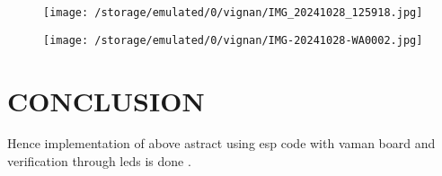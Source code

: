 \documentclass[conference]{IEEEtran}
\begin{document}
 \begin{figure}[h]                       
\centering                               
\texttt{[image: 	/storage/emulated/0/vignan/IMG\_20241028\_125918.jpg]}                                
\caption{\label{fig-5:Gates}}             
\end{figure}




 \begin{figure}[h]                           
\centering                                 
\texttt{[image:  /storage/emulated/0/vignan/IMG-20241028-WA0002.jpg]}                                           
\caption{\label{fig-6:Gates}}               
\end{figure}
\section{CONCLUSION}
Hence implementation of above astract using esp code with vaman board and verification through leds is done .
\end{document}
